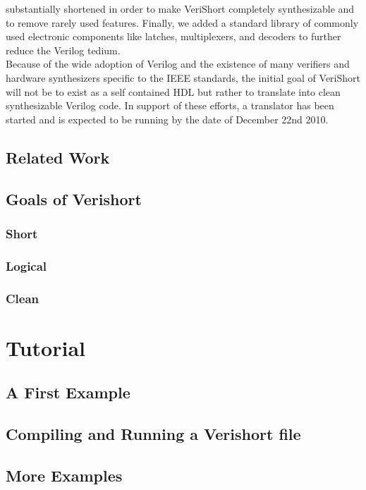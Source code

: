 \documentclass[letterpaper,11pt]{article}
\begin{document}
    substantially shortened in order to make VeriShort completely synthesizable and to 
    remove rarely used features. Finally, we added a standard library of commonly used 
    electronic components like latches, multiplexers, and decoders to further reduce the 
    Verilog tedium. \\
    \indent Because of the wide adoption of Verilog and the existence of many verifiers and 
    hardware synthesizers specific to the IEEE standards, the initial goal of VeriShort will not 
    be to exist as a self contained HDL but rather to translate into clean synthesizable Verilog 
    code. In support of these efforts, a translator has been started and is expected to be 
    running by the date of December 22nd 2010.

    \subsection{Related Work}
        \subsection{Goals of Verishort}
        \subsubsection{Short}
        \subsubsection{Logical}
        \subsubsection{Clean}


\section{Tutorial}
    \subsection{A First Example}
    \subsection{Compiling and Running a Verishort file}
    \subsection{More Examples}
\end{document}

